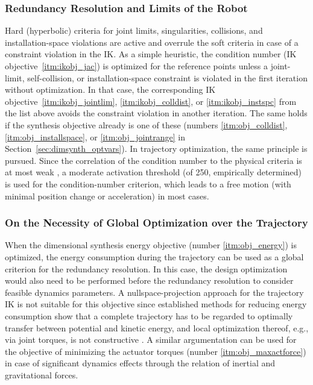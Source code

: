 \subsubsection{{Redundancy Resolution and Limits of the Robot}}
%

Hard (hyperbolic) criteria for joint limits, singularities, collisions, and installation-space violations are active and overrule the soft criteria in case of a constraint violation in the IK.
%
%
%
As a simple heuristic, the  condition number (IK objective~\ref{itm:ikobj_jac}) is optimized for the reference points unless a joint-limit, self-collision, or installation-space constraint is violated in the first iteration without optimization.
In that case, the corresponding IK objective~\ref{itm:ikobj_jointlim}, \ref{itm:ikobj_colldist}, or \ref{itm:ikobj_instspc} from the list above avoids the constraint violation in another iteration.
The same holds if the synthesis objective already is one of these (numbers \ref{itm:obj_colldist}, \ref{itm:obj_installspace}, or \ref{itm:obj_jointrange} in Section~\ref{sec:dimsynth_optvars}).
In trajectory optimization, the same principle is pursued.
Since the correlation of the  condition number to the physical criteria is at most weak \cite{Merlet2006}, a moderate activation threshold (of 250, empirically determined) is used for the condition-number criterion, which leads to a free motion (with minimal position change or acceleration) in most cases.


\subsubsection{{On the Necessity of Global Optimization over the Trajectory}}
%
When the dimensional synthesis energy objective (number \ref{itm:obj_energy}) is optimized, the energy consumption during the trajectory can be used as a global criterion for the redundancy resolution. %
In this case, the design optimization would also need to be performed before the redundancy resolution to consider feasible dynamics parameters. 
A nullspace-projection approach for the trajectory IK is not suitable for this objective since established methods for reducing energy consumption show that a complete trajectory has to be regarded to optimally transfer between potential and kinetic energy, and local optimization thereof, e.g., via joint torques, is not constructive \cite{HansenOeltMeiOrt2012}. 
A similar argumentation can be used for the objective of minimizing the actuator torques (number \ref{itm:obj_maxactforce}) in case of significant dynamics effects through the relation of inertial and gravitational forces.

